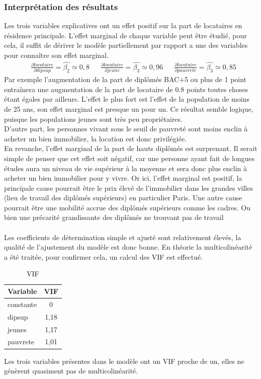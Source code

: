 \documentclass{article}
\begin{document}
\subsubsection{Interprétation des résultats}
Les trois variables explicatives ont un effet positif sur la part de locataires en résidence principale. L'effet marginal de chaque variable peut être étudié, pour cela,
il suffit de dériver le modèle partiellement par rapport a une des variables pour connaître son effet marginal.
\begin{align*}
    &\frac{\partial locataire}{\partial dipsup} = \hat{\beta_2} \simeq 0,8 & &\frac{\partial locataire}{\partial jeune} = \hat{\beta_3} \simeq 0,96 & &\frac{\partial locataire}{\partial pauvrete} = \hat{\beta_3} \simeq 0,85
\end{align*}
Par exemple l'augmentation de la part de diplômés BAC+5 ou plus de 1 point entraînera une augmentation de la part de locataire de 0.8 points toutes choses étant égales par ailleurs.
L'effet le plus fort est l'effet de la population de moins de 25 ans, son effet marginal est presque un pour un. Ce résultat semble logique, puisque les populations jeunes sont très peu
propriétaires\cite{insee_portrait_social}.
\\
D'autre part, les personnes vivant sous le seuil de pauvreté sont moins enclin à acheter un bien immobilier, la location est donc privilégiée.
\\
En revanche, l'effet marginal de la part de hauts diplômés est surprenant. Il serait simple de penser que cet effet soit négatif, car une personne ayant fait de longues études aura un niveau
de vie supérieur à la moyenne et sera donc plus enclin à acheter un bien immobilier pour y vivre. Or ici, l'effet marginal est positif, la principale cause pourrait être le prix élevé de l'immobilier dans les grandes villes (lieu de travail des diplômés supérieurs) en particulier Paris\cite{prix_immo_paris}. Une autre cause pourrait être une mobilité accrue des diplômés
supérieurs comme les cadres. Ou bien une précarité grandissante des diplômés ne trouvant pas de travail\cite{precarite_etude_sup}
\\ \\
Les coefficients de détermination simple et ajusté sont relativement élevés, la qualité de l'ajustement du modèle est donc bonne. En théorie la
multicolinéarité a été traitée, pour confirmer cela, un calcul des VIF est effectué.
\begin{table}[H]
\centering
\caption{VIF}
\begin{tabular}{l*{1}{c}}
\toprule
Variable            &         VIF\\
\midrule
constante & 0 \\
dipsup & 1,18 \\
jeunes & 1,17 \\
pauvrete & 1,01 \\
\bottomrule
\end{tabular}
\end{table}
Les trois variables présentes dans le modèle ont un VIF proche de un, elles ne génèrent quasiment pas de multicolinéarité.
\end{document}
